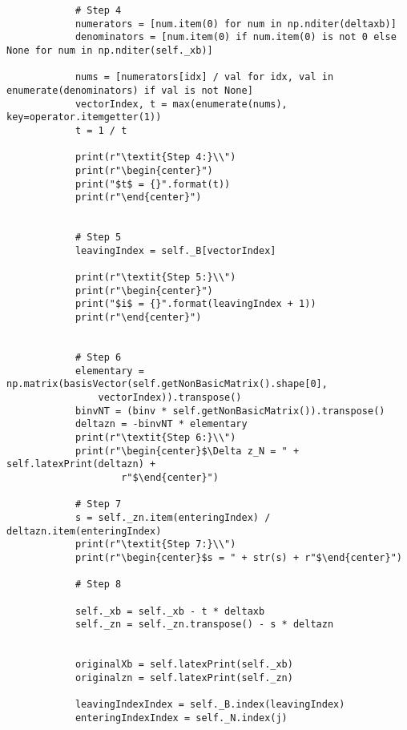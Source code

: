 \documentclass{article}
\begin{document}
\begin{lstlisting}
            # Step 4
            numerators = [num.item(0) for num in np.nditer(deltaxb)]
            denominators = [num.item(0) if num.item(0) is not 0 else None for num in np.nditer(self._xb)]

            nums = [numerators[idx] / val for idx, val in enumerate(denominators) if val is not None]
            vectorIndex, t = max(enumerate(nums), key=operator.itemgetter(1))
            t = 1 / t

            print(r"\textit{Step 4:}\\")
            print(r"\begin{center}")
            print("$t$ = {}".format(t))
            print(r"\end{center}")


            # Step 5
            leavingIndex = self._B[vectorIndex]

            print(r"\textit{Step 5:}\\")
            print(r"\begin{center}")
            print("$i$ = {}".format(leavingIndex + 1))
            print(r"\end{center}")


            # Step 6
            elementary = np.matrix(basisVector(self.getNonBasicMatrix().shape[0],
                vectorIndex)).transpose()
            binvNT = (binv * self.getNonBasicMatrix()).transpose()
            deltazn = -binvNT * elementary
            print(r"\textit{Step 6:}\\")
            print(r"\begin{center}$\Delta z_N = " + self.latexPrint(deltazn) +
                    r"$\end{center}")

            # Step 7
            s = self._zn.item(enteringIndex) / deltazn.item(enteringIndex)
            print(r"\textit{Step 7:}\\")
            print(r"\begin{center}$s = " + str(s) + r"$\end{center}")

            # Step 8

            self._xb = self._xb - t * deltaxb
            self._zn = self._zn.transpose() - s * deltazn


            originalXb = self.latexPrint(self._xb)
            originalzn = self.latexPrint(self._zn)

            leavingIndexIndex = self._B.index(leavingIndex)
            enteringIndexIndex = self._N.index(j)



\end{lstlisting}
\end{document}
